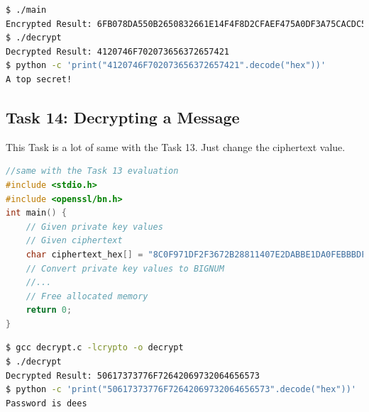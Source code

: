 \documentclass[a4paper]{article}
\begin{document}
\begin{lstlisting}[caption={Result of the Task 13},label={lst:task4.13-3},language=BASH,breaklines=true]
$ ./main
Encrypted Result: 6FB078DA550B2650832661E14F4F8D2CFAEF475A0DF3A75CACDC5DE5CFC5FADC
$ ./decrypt
Decrypted Result: 4120746F702073656372657421
$ python -c 'print("4120746F702073656372657421".decode("hex"))'
A top secret!
\end{lstlisting} 

\subsection{Task 14: Decrypting a Message}
This Task is a lot of same with the Task 13. Just change the ciphertext value.

\begin{lstlisting}[caption={C Program Code for Decryption},label={lst:task4.14},language=C,breaklines=true]
//same with the Task 13 evaluation
#include <stdio.h>
#include <openssl/bn.h>
int main() {
    // Given private key values
    // Given ciphertext
    char ciphertext_hex[] = "8C0F971DF2F3672B28811407E2DABBE1DA0FEBBBDFC7DCB67396567EA1E2493F";
    // Convert private key values to BIGNUM
    //...
    // Free allocated memory
    return 0;
}
\end{lstlisting} 
\begin{lstlisting}[caption={Result of the Task 14},label={lst:task4.14-2},language=BASH,breaklines=true]
$ gcc decrypt.c -lcrypto -o decrypt
$ ./decrypt
Decrypted Result: 50617373776F72642069732064656573
$ python -c 'print("50617373776F72642069732064656573".decode("hex"))'
Password is dees
\end{lstlisting} 
\end{document}
